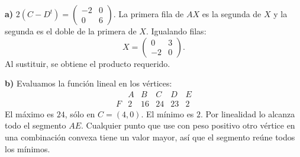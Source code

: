 \textbf{a)} $2(C-D^t)=\begin{pmatrix}-2&0\\0&6\end{pmatrix}$.
La primera fila de $AX$ es la segunda de $X$ y la segunda
es el doble de la primera de $X$. Igualando filas:
\[
X=\boxed{\begin{pmatrix}0&3\\-2&0\end{pmatrix}}.
\]
Al sustituir, se obtiene el producto requerido.

\textbf{b)} Evaluamos la función lineal en los vértices:
\[
\begin{array}{c|rrrrr}
 &A&B&C&D&E\\\hline
F&2&16&24&23&2
\end{array}
\]
El máximo es $\boxed{24}$, sólo en $C=(4,0)$.
El mínimo es $\boxed{2}$. Por linealidad lo alcanza todo el
segmento $AE$. Cualquier punto que use con peso positivo
otro vértice en una combinación convexa tiene un valor mayor,
así que el segmento reúne todos los mínimos.
